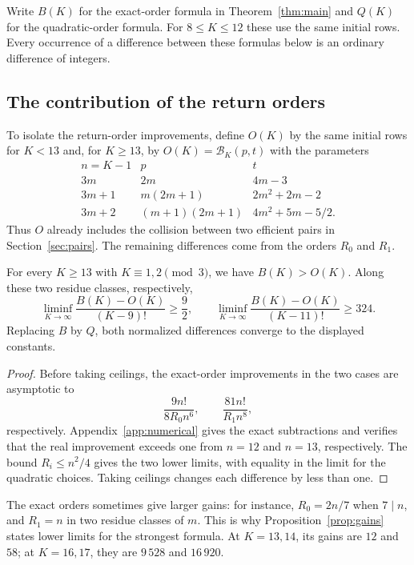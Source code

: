 Write $B(K)$ for the exact-order formula in Theorem~\ref{thm:main}
and $Q(K)$ for the quadratic-order formula. For $8\le K\le12$ these
use the same initial rows. Every occurrence of a difference between
these formulas below is an ordinary difference of integers.

\subsection{The contribution of the return orders}

To isolate the return-order improvements, define $O(K)$ by the same
initial rows for $K<13$ and, for $K\ge13$, by
$O(K)=\mathcal B_K(p,t)$ with the parameters
\[
\begin{array}{c|c|c}
n=K-1 & p & t\\\hline
3m & 2m & 4m-3\\
3m+1 & m(2m+1) & 2m^2+2m-2\\
3m+2 & (m+1)(2m+1) & 4m^2+5m-5/2.
\end{array}
\]
Thus $O$ already includes the collision between two efficient pairs in
Section~\ref{sec:pairs}. The remaining differences come from the
orders $R_0$ and $R_1$.

\begin{proposition}\label{prop:gains}
For every $K\ge13$ with $K\equiv1,2\pmod3$, we have
$B(K)>O(K)$. Along these two residue
classes, respectively,
\[
 \liminf_{K\to\infty}
 \frac{B(K)-O(K)}{(K-9)!}
 \ge\frac92,
 \qquad
 \liminf_{K\to\infty}
 \frac{B(K)-O(K)}{(K-11)!}
 \ge324.
\]
Replacing $B$ by $Q$, both normalized differences converge to the
displayed constants.
\end{proposition}

\begin{proof}
Before taking ceilings, the exact-order improvements in the two cases are
asymptotic to
\[
 \frac{9n!}{8R_0n^6},\qquad \frac{81n!}{R_1n^8},
\]
respectively. Appendix~\ref{app:numerical} gives the exact subtractions
and verifies that the real improvement exceeds one from $n=12$ and
$n=13$, respectively. The bound $R_i\le n^2/4$ gives the two lower
limits, with equality in the limit for the quadratic choices.
Taking ceilings changes each difference by less than one.
\end{proof}

The exact orders sometimes give larger gains: for instance,
$R_0=2n/7$ when $7\mid n$, and $R_1=n$ in two residue classes of
$m$. This is why Proposition~\ref{prop:gains} states lower limits
for the strongest formula. At $K=13,14$, its gains are $12$ and
$58$; at $K=16,17$, they are $9\,528$ and $16\,920$.

